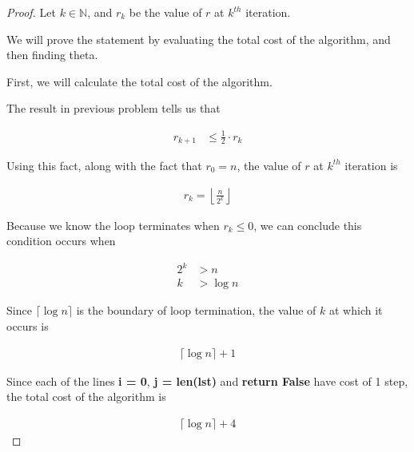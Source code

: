\documentclass[12pt]{article}
\begin{document}
\begin{enumerate}[a.]
    \begin{proof}

        Let $k \in \mathbb{N}$, and $r_k$ be the value of $r$ at $k^{th}$ iteration.

        \bigskip

        We will prove the statement by evaluating the total cost of the algorithm, and
        then finding theta.

        \bigskip

        First, we will calculate the total cost of the algorithm.

        \bigskip

        The result in previous problem tells us that

        \setcounter{equation}{0}
        \begin{align}
            r_{k+1} &\leq \frac{1}{2} \cdot r_k
        \end{align}

        \bigskip

        Using this fact, along with the fact that $r_0 = n$, the value of $r$ at $k^{th}$ iteration is

        \begin{align}
            r_k = \left\lfloor \frac{n}{2^k} \right\rfloor
        \end{align}

        \bigskip

        Because we know the loop terminates when $r_k \leq 0$, we can conclude this
        condition occurs when

        \begin{align}
            2^k &> n\\
            k &> \log n
        \end{align}

        \bigskip

        Since $\lceil \log n \rceil$ is the boundary of loop termination, the value of $k$
        at which it occurs is

        \begin{align}
            \lceil \log n \rceil + 1
        \end{align}

        \bigskip

        Since each of the lines \textbf{i = 0}, \textbf{j = len(lst)} and \textbf{return False}
        have cost of 1 step, the total cost of the algorithm is

        \begin{align}
            \lceil \log n \rceil + 4
        \end{align}


\end{proof}
\end{enumerate}
\end{document}
